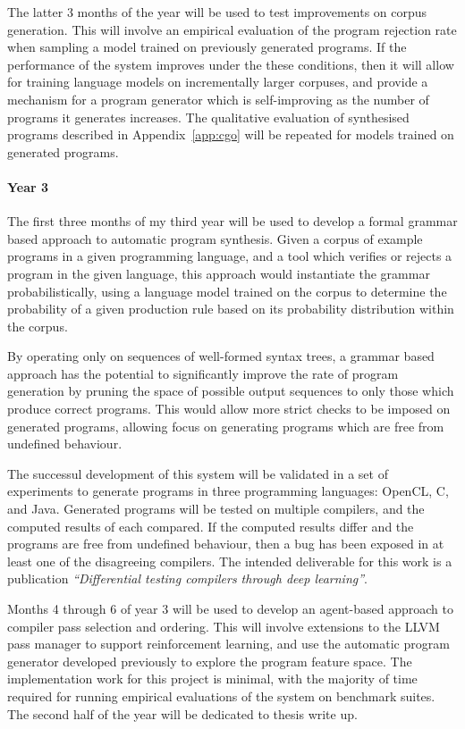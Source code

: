The latter 3 months of the year will be used to test improvements on corpus generation. This will involve an empirical evaluation of the program rejection rate when sampling a model trained on previously generated programs. If the performance of the system improves under the these conditions, then it will allow for training language models on incrementally larger corpuses, and provide a mechanism for a program generator which is self-improving as the number of programs it generates increases. The qualitative evaluation of synthesised programs described in Appendix~\ref{app:cgo} will be repeated for models trained on generated programs.

\paragraph{Year 3} The first three months of my third year will be used to develop a formal grammar based approach to automatic program synthesis. Given a corpus of example programs in a given programming language, and a tool which verifies or rejects a program in the given language, this approach would instantiate the grammar probabilistically, using a language model trained on the corpus to determine the probability of a given production rule based on its probability distribution within the corpus.

By operating only on sequences of well-formed syntax trees, a grammar based approach has the potential to significantly improve the rate of program generation by pruning the space of possible output sequences to only those which produce correct programs. This would allow more strict checks to be imposed on generated programs, allowing focus on generating programs which are free from undefined behaviour.

The successul development of this system will be validated in a set of experiments to generate programs in three programming languages: OpenCL, C, and Java. Generated programs will be tested on multiple compilers, and the computed results of each compared. If the computed results differ and the programs are free from undefined behaviour, then a bug has been exposed in at least one of the disagreeing compilers. The intended deliverable for this work is a publication \emph{``Differential testing compilers through deep learning''}.

Months 4 through 6 of year 3 will be used to develop an agent-based approach to compiler pass selection and ordering. This will involve extensions to the LLVM pass manager to support reinforcement learning, and use the automatic program generator developed previously to explore the program feature space. The implementation work for this project is minimal, with the majority of time required for running empirical evaluations of the system on benchmark suites. The second half of the year will be dedicated to thesis write up.
